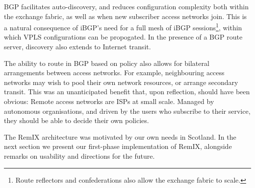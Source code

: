 BGP facilitates auto-discovery, and reduces configuration complexity both within
the exchange fabric, as well as when new subscriber access networks join. This
is a natural consequence of iBGP's need for a full mesh of iBGP
sessions\footnote{Route reflectors and confederations also allow the exchange
fabric to scale.}, within which VPLS configurations can be propogated. In the
presence of a BGP route server, discovery also extends to Internet transit.

The ability to route in BGP based on policy also allows for bilateral
arrangements between access networks. For example, neighbouring access networks
may wish to pool their own network resources, or arrange secondary transit. This
was an unanticipated benefit that, upon reflection, should have been obvious:
Remote access networks are ISPs at small scale. Managed by
autonomous organisations, and driven by the users who subscribe to their
service, they should be able to decide their own policies.

The RemIX architecture was motivated by our own needs in Scotland. In the next section we present our first-phase implementation of RemIX, alongside remarks on usability and directions for the future.

